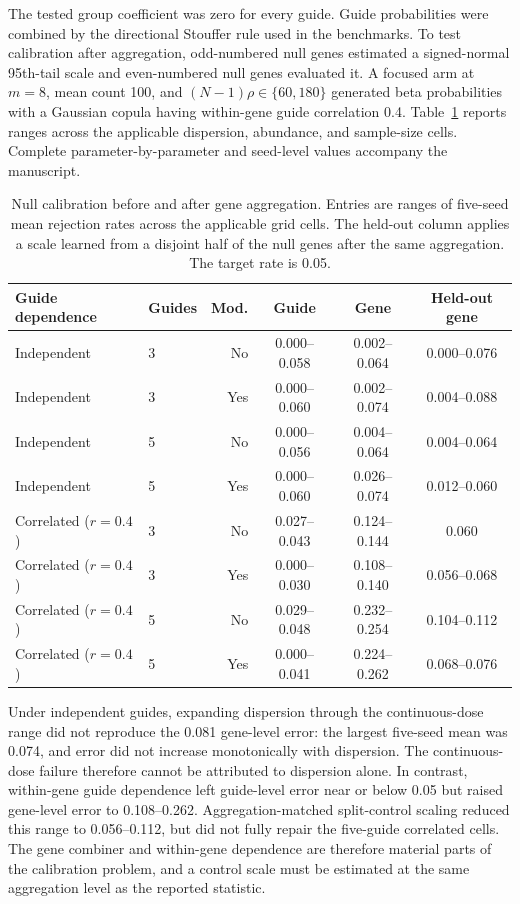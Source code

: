 The tested group coefficient was zero for every guide.  Guide probabilities
were combined by the directional Stouffer rule used in the benchmarks.  To
test calibration after aggregation, odd-numbered null genes estimated a
signed-normal 95th-tail scale and even-numbered null genes evaluated it.
A focused arm at $m=8$, mean count 100, and
$(N-1)\rho\in\{60,180\}$ generated beta probabilities with a Gaussian copula
having within-gene guide correlation 0.4.  Table~\ref{tab:calibration-grid}
reports ranges across the applicable dispersion, abundance, and sample-size
cells.  Complete parameter-by-parameter and seed-level values accompany the
manuscript.

\begin{table}[htbp]
\centering
\caption{Null calibration before and after gene aggregation.  Entries are
ranges of five-seed mean rejection rates across the applicable grid cells.
The held-out column applies a scale learned from a disjoint half of the null
genes after the same aggregation.  The target rate is 0.05.}
\label{tab:calibration-grid}
\small
\setlength{\tabcolsep}{3.5pt}
\begin{tabular}{llrccc}
\toprule
Guide dependence & Guides & Mod. & Guide & Gene & Held-out gene\\
\midrule
Independent & 3 & No  & 0.000--0.058 & 0.002--0.064 & 0.000--0.076\\
Independent & 3 & Yes & 0.000--0.060 & 0.002--0.074 & 0.004--0.088\\
Independent & 5 & No  & 0.000--0.056 & 0.004--0.064 & 0.004--0.064\\
Independent & 5 & Yes & 0.000--0.060 & 0.026--0.074 & 0.012--0.060\\
Correlated ($r=0.4$) & 3 & No  & 0.027--0.043 & 0.124--0.144 & 0.060\\
Correlated ($r=0.4$) & 3 & Yes & 0.000--0.030 & 0.108--0.140 & 0.056--0.068\\
Correlated ($r=0.4$) & 5 & No  & 0.029--0.048 & 0.232--0.254 & 0.104--0.112\\
Correlated ($r=0.4$) & 5 & Yes & 0.000--0.041 & 0.224--0.262 & 0.068--0.076\\
\bottomrule
\end{tabular}
\end{table}

Under independent guides, expanding dispersion through the continuous-dose
range did not reproduce the 0.081 gene-level error: the largest five-seed mean
was 0.074, and error did not increase monotonically with dispersion.  The
continuous-dose failure therefore cannot be attributed to dispersion alone.
In contrast, within-gene guide dependence left guide-level error near or below
0.05 but raised gene-level error to 0.108--0.262.  Aggregation-matched
split-control scaling reduced this range to 0.056--0.112, but did not fully
repair the five-guide correlated cells.  The gene combiner and within-gene
dependence are therefore material parts of the calibration problem, and a
control scale must be estimated at the same aggregation level as the reported
statistic.

